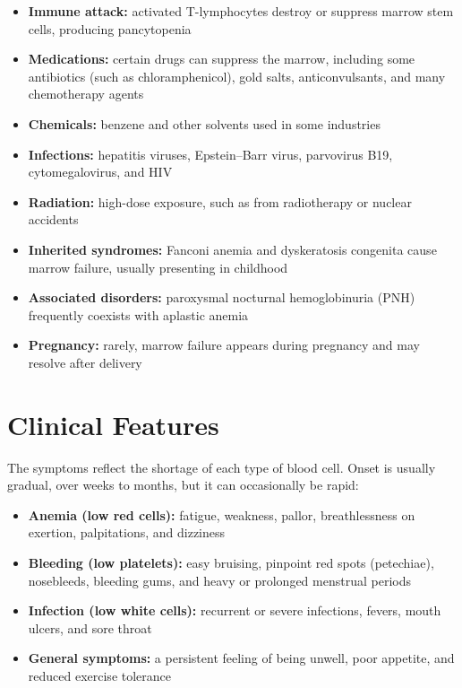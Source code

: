 \begin{itemize}
    \item \textbf{Immune attack:} activated T-lymphocytes destroy or suppress marrow stem cells, producing pancytopenia
    \item \textbf{Medications:} certain drugs can suppress the marrow, including some antibiotics (such as chloramphenicol), gold salts, anticonvulsants, and many chemotherapy agents
    \item \textbf{Chemicals:} benzene and other solvents used in some industries
    \item \textbf{Infections:} hepatitis viruses, Epstein--Barr virus, parvovirus B19, cytomegalovirus, and HIV
    \item \textbf{Radiation:} high-dose exposure, such as from radiotherapy or nuclear accidents
    \item \textbf{Inherited syndromes:} Fanconi anemia and dyskeratosis congenita cause marrow failure, usually presenting in childhood
    \item \textbf{Associated disorders:} paroxysmal nocturnal hemoglobinuria (PNH) frequently coexists with aplastic anemia
    \item \textbf{Pregnancy:} rarely, marrow failure appears during pregnancy and may resolve after delivery
\end{itemize}

\section*{Clinical Features}
The symptoms reflect the shortage of each type of blood cell. Onset is usually gradual, over weeks to months, but it can occasionally be rapid:

\begin{itemize}
    \item \textbf{Anemia (low red cells):} fatigue, weakness, pallor, breathlessness on exertion, palpitations, and dizziness
    \item \textbf{Bleeding (low platelets):} easy bruising, pinpoint red spots (petechiae), nosebleeds, bleeding gums, and heavy or prolonged menstrual periods
    \item \textbf{Infection (low white cells):} recurrent or severe infections, fevers, mouth ulcers, and sore throat
    \item \textbf{General symptoms:} a persistent feeling of being unwell, poor appetite, and reduced exercise tolerance
\end{itemize}

